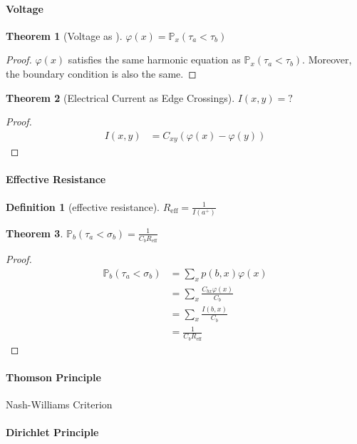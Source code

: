 \documentclass{article}
\newtheorem{Thm}{Theorem}[section]
\theoremstyle{definition}
\newtheorem{Def}{Definition}[section]
\newcommand{\PP}{\mathbb{P}}
\newcommand{\<}{\left\langle}
\renewcommand{\>}{\right\rangle}
\begin{document}
\paragraph{Voltage}
\begin{Thm}[Voltage as ]
$\varphi(x)=\PP_x(\tau_a<\tau_b)$
\end{Thm}
\begin{proof}
    $\varphi(x)$ satisfies the same harmonic equation as $\PP_x(\tau_a<\tau_b)$.
    Moreover, the boundary condition is also the same.
\end{proof}


\begin{Thm}[Electrical Current as Edge Crossings]
    $I(x,y)=?$
\end{Thm}
\begin{proof}
    \begin{align*}
        I(x,y)&=C_{xy}(\varphi(x)-\varphi(y))
    \end{align*}
\end{proof}

\paragraph{Effective Resistance} 
\begin{Def}[effective resistance]
    $R_{\text{eff}}=\frac{1}{I(a^+)}$
\end{Def}

\begin{Thm}
    $\PP_b(\tau_a<\sigma_b)=\frac{1}{C_bR_{\text{eff}}}$
\end{Thm}
\begin{proof}
    \begin{align*}
        \PP_b(\tau_a<\sigma_b)&=\sum_x p(b,x)\varphi(x)\\
        &=\sum_x \frac{C_{bx}\varphi(x)}{C_b}\\
        &=\sum_x \frac{I(b,x)}{C_b}\\
        &=\frac{1}{C_bR_{\text{eff}}}
    \end{align*}
\end{proof}

\paragraph{Thomson Principle}
Nash-Williams Criterion



\paragraph{Dirichlet Principle}
\end{document}
